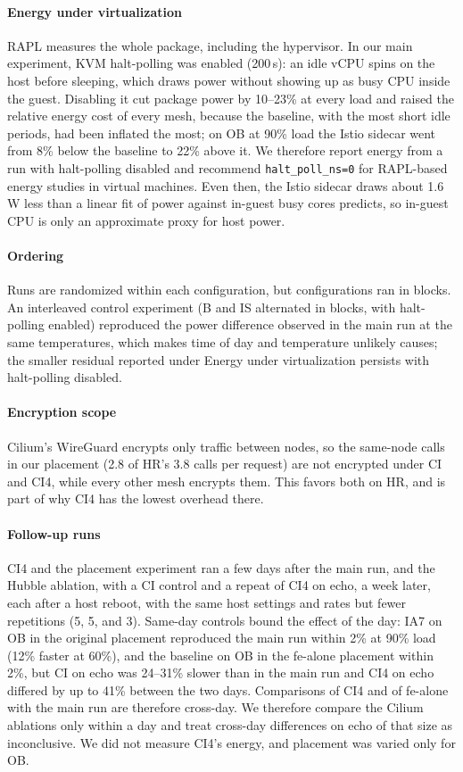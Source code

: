 \paragraph{Energy under virtualization}
RAPL measures the whole package, including the hypervisor. In our main
experiment, KVM halt-polling was enabled (200\,\textmu s): an idle vCPU spins
on the host before sleeping, which draws power without showing up as busy CPU
inside the guest. Disabling it cut package power by 10--23\% at every load and
raised the relative energy cost of every mesh, because the baseline, with the
most short idle periods, had been inflated the most; on OB at 90\% load the
Istio sidecar went from 8\% below the baseline to 22\% above it. We therefore
report energy from a run with halt-polling disabled and recommend
\texttt{halt\_poll\_ns=0} for RAPL-based energy studies in virtual machines.
Even then, the Istio sidecar draws about 1.6\,W less than a linear fit of power
against in-guest busy cores predicts, so in-guest CPU is only an approximate
proxy for host power.

\paragraph{Ordering}
Runs are randomized within each configuration, but configurations ran in
blocks. An interleaved control experiment (B and IS alternated in blocks, with
halt-polling enabled) reproduced the power difference observed in the main run
at the same temperatures, which makes time of day and temperature unlikely
causes; the smaller residual reported under Energy under virtualization persists
with halt-polling disabled.

\paragraph{Encryption scope}
Cilium's WireGuard encrypts only traffic between nodes, so the same-node calls
in our placement (2.8 of HR's 3.8 calls per request) are not encrypted under
CI and CI4, while every other mesh encrypts them. This favors both on HR, and
is part of why CI4 has the lowest overhead there.

\paragraph{Follow-up runs}
CI4 and the placement experiment ran a few days after the main run, and the
Hubble ablation, with a CI control and a repeat of CI4 on echo, a week later,
each after a host reboot, with the
same host settings and rates but fewer repetitions (5, 5, and 3). Same-day
controls bound the effect of the day: IA7 on OB in the original placement
reproduced the main run within 2\% at 90\% load (12\% faster at 60\%), and
the baseline on OB in the fe-alone placement within 2\%, but CI on echo was
24--31\% slower than in the main run and CI4 on echo differed by up to 41\%
between the two days. Comparisons of CI4 and of fe-alone with the main run are
therefore cross-day. We therefore compare the
Cilium ablations only within a day and treat cross-day differences on echo of
that size as inconclusive. We did not measure CI4's energy, and placement was
varied only for OB.

